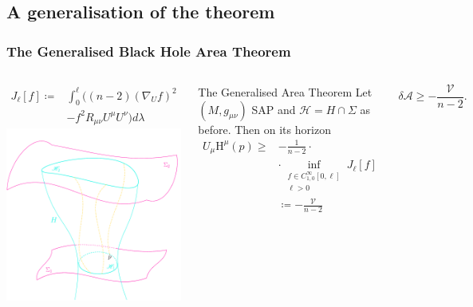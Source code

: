 \documentclass[]{beamer}
\begin{document}
	\subsection{A generalisation of the theorem}
	\begin{frame}
		\frametitle{The Generalised Black Hole Area Theorem}
		
		\begin{columns}
			\begin{align*}
				J_{\ell}[f]\coloneqq & \int_{0}^{\ell} \big((n -2)(\nabla_Uf)^2 \\
				& - f^2R_{\mu\nu}U^{\mu}U^{\nu} \big)d\lambda
			\end{align*}
			\vskip -20pt
			\includegraphics[scale=0.33]{Immagini/flow-generators/flow-generators.pdf}
			\vskip -11pt
			\begin{theoblock}{The Generalised Area Theorem}
				Let \((M, g_{\mu\nu})\) SAP and \(\mathscr{H} = H \cap \Sigma\) as before. Then on its horizon
				\begin{align*}
					U_{\mu}\mathrm{H}^{\mu}(p) \ge &-\frac{1}{n - 2} \cdot \\
					&\cdot\inf_{\substack{f\in C^{\infty}_{1,0}[0, \ell]\\ \ell > 0}}J_{\ell}[f]\\
					&\coloneqq -\frac{\mathcal{V}}{n - 2}
				\end{align*}
			\end{theoblock}
			\begin{ideablock}{}
				\[
					\delta \mathcal{A} \ge -\frac{\mathcal{V}}{n - 2}.
				\]
			\end{ideablock}
		\end{columns}
	\end{frame}
\end{document}
